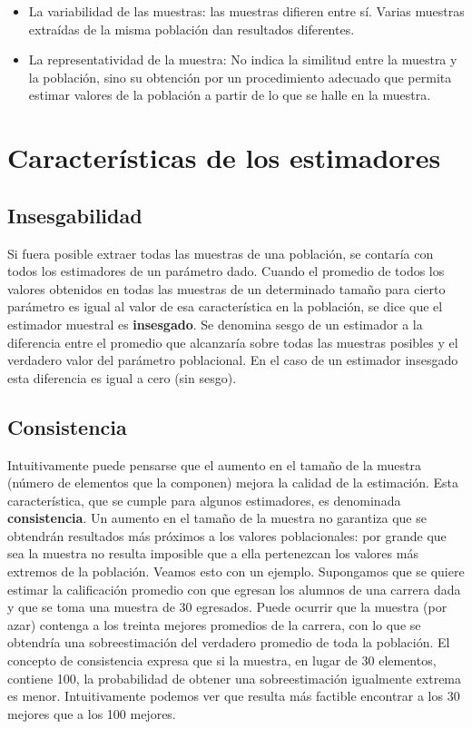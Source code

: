 \documentclass[]{book}
\begin{document}
\begin{itemize}
\item
  La variabilidad de las muestras: las muestras difieren entre sí. Varias muestras extraídas de la misma población dan resultados diferentes.
\item
  La representatividad de la muestra: No indica la similitud entre la
  muestra y la población, sino su obtención por un procedimiento adecuado
  que permita estimar valores de la población a partir de lo que se halle
  en la muestra.
\end{itemize}

\hypertarget{caracteruxedsticas-de-los-estimadores}{%
\section{Características de los estimadores}\label{caracteruxedsticas-de-los-estimadores}}

\hypertarget{insesgabilidad}{%
\subsection{Insesgabilidad}\label{insesgabilidad}}

Si fuera posible extraer todas las muestras de una población, se
contaría con todos los estimadores de un parámetro dado. Cuando el
promedio de todos los valores obtenidos en todas las muestras de un
determinado tamaño para cierto parámetro es igual al valor de esa
característica en la población, se dice que el estimador muestral es
\textbf{insesgado}. Se denomina sesgo de un estimador a la diferencia entre
el promedio que alcanzaría sobre todas las muestras posibles y el
verdadero valor del parámetro poblacional. En el caso de un estimador
insesgado esta diferencia es igual a cero (sin sesgo).

\hypertarget{consistencia}{%
\subsection{Consistencia}\label{consistencia}}

Intuitivamente puede pensarse que el aumento en el tamaño de la muestra
(número de elementos que la componen) mejora la calidad de la
estimación. Esta característica, que se cumple para algunos estimadores,
es denominada \textbf{consistencia}. Un aumento en el tamaño de la muestra no
garantiza que se obtendrán resultados más próximos a los valores
poblacionales: por grande que sea la muestra no resulta imposible que a
ella pertenezcan los valores más extremos de la población. Veamos esto
con un ejemplo. Supongamos que se quiere estimar la calificación
promedio con que egresan los alumnos de una carrera dada y que se toma
una muestra de 30 egresados. Puede ocurrir que la muestra (por azar)
contenga a los treinta mejores promedios de la carrera, con lo que se
obtendría una sobreestimación del verdadero promedio de toda la
población. El concepto de consistencia expresa que si la muestra, en
lugar de 30 elementos, contiene 100, la probabilidad de obtener una
sobreestimación igualmente extrema es menor. Intuitivamente podemos ver
que resulta más factible encontrar a los 30 mejores que a los 100
mejores.
\end{document}
